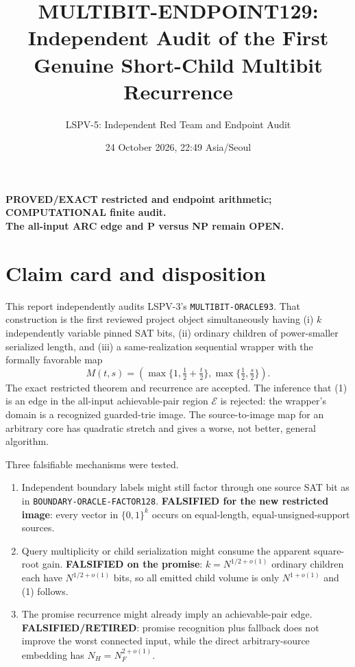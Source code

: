 \documentclass[11pt]{article}
\title{MULTIBIT-ENDPOINT129:\\Independent Audit of the First Genuine Short-Child Multibit Recurrence}
\author{LSPV-5: Independent Red Team and Endpoint Audit}
\date{24 October 2026, 22:49 Asia/Seoul}
\begin{document}
\maketitle

\begin{center}
\textbf{PROVED/EXACT restricted and endpoint arithmetic; COMPUTATIONAL finite audit.}\\
\textbf{The all-input ARC edge and P versus NP remain OPEN.}
\end{center}

\section{Claim card and disposition}
This report independently audits LSPV-3's \texttt{MULTIBIT-ORACLE93}.
That construction is the first reviewed project object simultaneously having
(i) $k$ independently variable pinned SAT bits, (ii) ordinary children of
power-smaller serialized length, and (iii) a same-realization sequential
wrapper with the formally favorable map
\[
 M(t,s)=\left(\max\{1,\tfrac12+\tfrac t2\},
                  \max\{\tfrac12,\tfrac s2\}\right).                 \tag{1}
\]
The exact restricted theorem and recurrence are accepted.  The inference
that (1) is an edge in the all-input achievable-pair region $\mathcal E$ is
rejected: the wrapper's domain is a recognized guarded-trie image.  The
source-to-image map for an arbitrary core has quadratic stretch and gives a
worse, not better, general algorithm.

Three falsifiable mechanisms were tested.
\begin{enumerate}
\item Independent boundary labels might still factor through one source SAT
bit as in \texttt{BOUNDARY-ORACLE-FACTOR128}.  \textbf{FALSIFIED for the new
restricted image}: every vector in $\{0,1\}^k$ occurs on equal-length,
equal-unsigned-support sources.
\item Query multiplicity or child serialization might consume the apparent
square-root gain.  \textbf{FALSIFIED on the promise}: $k=N^{1/2+o(1)}$
ordinary children each have $N^{1/2+o(1)}$ bits, so all emitted child volume
is only $N^{1+o(1)}$ and (1) follows.
\item The promise recurrence might already imply an achievable-pair edge.
\textbf{FALSIFIED/RETIRED}: promise recognition plus fallback does not improve
the worst connected input, while the direct arbitrary-source embedding has
$N_H=N_F^{2+o(1)}$.
\end{enumerate}
\end{document}
